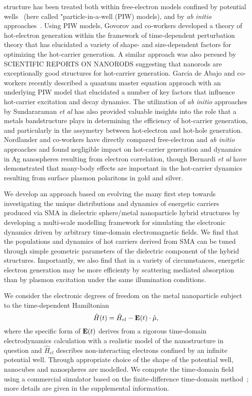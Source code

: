 \documentclass[journal=jpclcd,manuscript=letter]{achemso}
\begin{document}
structure has been treated both within free-electron models confined by potential wells~\cite{all_the_PIW_papers} (here called
"particle-in-a-well (PIW) models), and by {\it ab initio} approaches~\cite{all_the_dft_papers}.
Using PIW models, Govorov and co-workers developed a theory of 
hot-electron generation within the framework of time-dependent perturbation theory that
has elucidated a variety of shape- and size-dependent factors for optimizing 
the hot-carrier generation.  A similar approach was also persued by SCIENTIFIC REPORTS ON NANORODS suggesting
that nanorods are exceptionally good structures for hot-carrier generation.  Garcia de Abajo and co-workers recently described a 
quantum master equation approach with an underlying PIW model that elucidated a number of key factors that influence
hot-carrier excitation and decay dynamics.  The utilization of {\it ab initio} approaches by Sundararaman {\it et al} 
has also provided valuable insights into the role that a metals bandstructure plays
in determining the efficiency of hot-carrier generation, and particularly in the assymetry between hot-electron
and hot-hole generation.  Nordlander and co-workers have directly compared free-electron and {\it ab initio} approaches
and found negligible impact on hot-carrier generation and dynamics in Ag nanospheres resulting from electron correlation, 
though Bernardi {\it et al} have demonstrated that many-body effects are important in the hot-carrier dynamics resulting
from surface plasmon polaritons in gold and silver.

We develop an approach based on evolving the many first step towards investigating the unique distributions and dynamics of energetic carriers produced via SMA in 
dielectric sphere/metal nanoparticle hybrid structures by developing a multi-scale modelling framework
for simulating the electronic dynamics driven by arbitrary time-domain electromagnetic fields.  We find that the populations
and dynamics of hot carriers derived from SMA can be tuned through simple
geometric parameters of the dielectric component of the hybrid structures.   Importantly, we also find that in a variety of circumstances, energetic electron
generation may be more efficienty by scattering mediated absorption than by plasmon excitation under the same illumination conditions.

We consider the electronic degrees of freedom on the metal nanoparticle subject to the time-dependent Hamiltonian 
\begin{equation}\label{eq:TDHam}
\hat{H}(t) = \hat{H}_{el} - {\bf E}(t) \cdot \hat{\mu}, 
\end{equation}
where the specific form of ${\bf E}(t)$ derives from a rigorous time-domain electrodynamics calculation with a realistic model
of the nanostructure in question and $\hat{H}_{el}$ describes non-interacting electrons confined by an infinite potential well.  
Through appropriate choice of the shape of the potential well, nanocubes and nanospheres are modelled.  We compute the time-domain field 
using a commercial simulator based on the finite-difference time-domain method~\cite{Lumerical}; more details are given in 
the supplemental information.    
\end{document}

